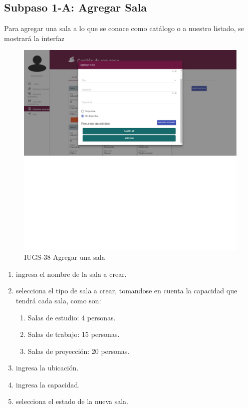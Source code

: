 \subsection{Subpaso 1-A: Agregar Sala}
	Para agregar una sala a lo que se conoce como catálogo o a nuestro listado,
	se mostrará la interfaz \par
		\begin{figure}[hbtp]	
			\centering
				\includegraphics[scale=0.3]{images/Interfaz/IUGS38_AgregarSala.png}
				\caption{IUGS-38 Agregar una sala}
		\end{figure}
	
	\begin{enumerate}
		\item ingresa el nombre de la sala a crear.
		\item selecciona el tipo de sala a crear, tomandose en cuenta la capacidad
			que tendrá cada sala, como son:
			\begin{enumerate}
				\item Salas de estudio: 4 personas.
				\item Salas de trabajo: 15 personas.
				\item Salas de proyección: 20 personas.
			\end{enumerate}
		\item ingresa la ubicación.
		\item ingresa la capacidad.
		\item selecciona el estado de la nueva sala. 		
	\end{enumerate}
	

